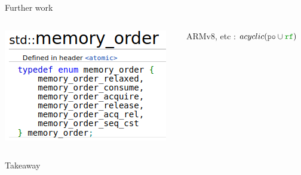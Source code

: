 \begin{frame}{Further work}
  \begin{columns}
    \begin{column}{0.4\linewidth}
      {\includegraphics[width=0.8\linewidth]{modes.png}}
    \end{column}
    \begin{column}{0.4\linewidth}
      {\large ARMv8, etc : \sout{$acyclic(\lPO \cup \lRF)$}}
    \end{column}
    
  \end{columns}
  
\end{frame}

\begin{frame}{Takeaway}
  
  
  \begin{columns}
    \begin{column}{0.5\linewidth}      
      \scalebox{0.7}{\fairTrace}
    \end{column}    
    \begin{column}{0.4\linewidth}
      \renewcommand{\hof}{2}
      \renewcommand{\vof}{1}
      \scalebox{0.8}{
      \begin{tikzpicture}[xscale=2, yscale=0.8]
        \spinlockContraGraphEventsI
        \spinlockContraGraphRelationsI
        \spinlockContraGraphEventsII
        \spinlockContraGraphRelationsII
        \spinlockContraGraphContra
      \end{tikzpicture}
      }
    \end{column}
  \end{columns}


\end{frame}
